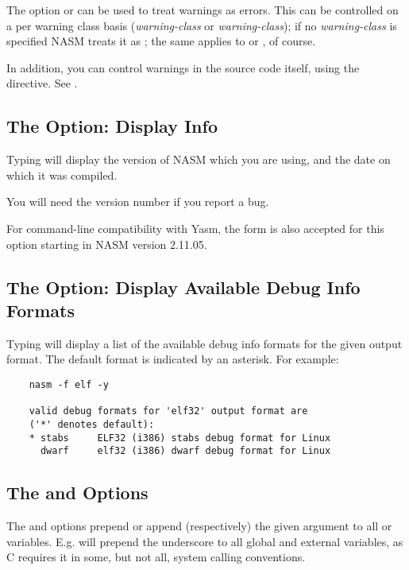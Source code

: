 The option  or  can be used to treat warnings
as errors.  This can be controlled on a per warning class basis
(\emph{warning-class} or \emph{warning-class});
if no \emph{warning-class} is specified NASM treats it as
; the same applies to  or
, of course.

In addition, you can control warnings in the source code itself, using
the \codeindex{[WARNING]} directive. See .

\subsection{The  Option: Display  Info}
\label{subsec:opt-v}

Typing  will display the version of NASM which you are using,
and the date on which it was compiled.

You will need the version number if you report a bug.

For command-line compatibility with Yasm, the form  is also
accepted for this option starting in NASM version 2.11.05.

\subsection{The  Option: Display Available Debug Info Formats}
\label{subsec:opt-y}

Typing  will display a list of the available
debug info formats for the given output format. The default format
is indicated by an asterisk. For example:

\begin{lstlisting}
	nasm -f elf -y

	valid debug formats for 'elf32' output format are
	('*' denotes default):
	* stabs     ELF32 (i386) stabs debug format for Linux
	  dwarf     elf32 (i386) dwarf debug format for Linux
\end{lstlisting}

\subsection{The  and  Options}
\label{subsec:opt-pfix}

The  and  options prepend or append
(respectively) the given argument to all  or
 variables. E.g.  will prepend the
underscore to all global and external variables, as C requires it in
some, but not all, system calling conventions.

